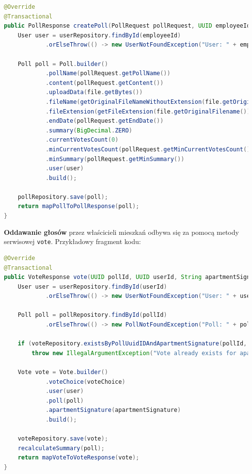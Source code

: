 \begin{lstlisting}[language=Java, caption=Fragment metody \texttt{createPoll}]
@Override
@Transactional
public PollResponse createPoll(PollRequest pollRequest, UUID employeeId, MultipartFile file) throws UserNotFoundException, IOException {
    User user = userRepository.findById(employeeId)
            .orElseThrow(() -> new UserNotFoundException("User: " + employeeId + " not found"));

    Poll poll = Poll.builder()
            .pollName(pollRequest.getPollName())
            .content(pollRequest.getContent())
            .uploadData(file.getBytes())
            .fileName(getOriginalFileNameWithoutExtension(file.getOriginalFilename()))
            .fileExtension(getFileExtension(file.getOriginalFilename()))
            .endDate(pollRequest.getEndDate())
            .summary(BigDecimal.ZERO)
            .currentVotesCount(0)
            .minCurrentVotesCount(pollRequest.getMinCurrentVotesCount())
            .minSummary(pollRequest.getMinSummary())
            .user(user)
            .build();

    pollRepository.save(poll);
    return mapPollToPollResponse(poll);
}
\end{lstlisting}

\textbf{Oddawanie głosów} przez właścicieli mieszkań odbywa się za pomocą metody serwisowej \texttt{vote}. Przykładowy fragment kodu:

\begin{lstlisting}[language=Java, caption=Fragment metody \texttt{vote}]
@Override
@Transactional
public VoteResponse vote(UUID pollId, UUID userId, String apartmentSignature, VoteChoice voteChoice) throws UserNotFoundException, PollNotFoundException, ApartmentNotFoundException {
    User user = userRepository.findById(userId)
            .orElseThrow(() -> new UserNotFoundException("User: " + userId + " not found"));

    Poll poll = pollRepository.findById(pollId)
            .orElseThrow(() -> new PollNotFoundException("Poll: " + pollId + " not found"));

    if (voteRepository.existsByPollUuidIDAndApartmentSignature(pollId, apartmentSignature))
        throw new IllegalArgumentException("Vote already exists for apartment");

    Vote vote = Vote.builder()
            .voteChoice(voteChoice)
            .user(user)
            .poll(poll)
            .apartmentSignature(apartmentSignature)
            .build();

    voteRepository.save(vote);
    recalculateSummary(poll);
    return mapVoteToVoteResponse(vote);
}
\end{lstlisting}

